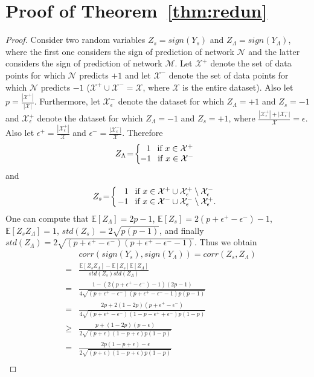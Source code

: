 \documentclass[twoside]{article}
\begin{document}
\section{Proof of Theorem~\ref{thm:redun}}
\begin{proof}
Consider two random variables $Z_s = sign(Y_s)$ and $Z_{\Lambda} = sign(Y_{\Lambda})$, where the first one considers the sign of prediction of network $\mathcal{N}$ and the latter considers the sign of prediction of network $\mathcal{M}$. Let $\mathcal{X}^{+}$ denote the set of data points for which $\mathcal{N}$ predicts $+1$ and let $\mathcal{X}^{-}$ denote the set of data points for which $\mathcal{N}$ predicts $-1$ ($\mathcal{X}^{+} \cup \mathcal{X}^{-} = \mathcal{X}$, where $\mathcal{X}$ is the entire dataset). Also let $p = \frac{|\mathcal{X}^{+}|}{|\mathcal{X}|}$. Furthermore, let $\mathcal{X}_{\epsilon}^{-}$ denote the dataset for which $Z_{\Lambda} = +1$ and $Z_s = -1$ and $\mathcal{X}_{\epsilon}^{+}$ denote the dataset for which $Z_{\Lambda} = -1$ and $Z_s = +1$, where $\frac{|\mathcal{X}_{\epsilon}^{+}| + |\mathcal{X}_{\epsilon}^{-}|}{\mathcal{X}} = \epsilon$. Also let $\epsilon^{+} = \frac{|\mathcal{X}_{\epsilon}^{+}|}{\mathcal{X}}$ and $\epsilon^{-} = \frac{|\mathcal{X}_{\epsilon}^{-}|}{\mathcal{X}}$. Therefore
\[Z_{\Lambda} \!=\! \left \{
  \begin{tabular}{c}
  $1$ \:\:if $x \in \mathcal{X}^{+}$\\
  \!\!\!\!$-1$ \:\:if $x \in \mathcal{X}^{-}$
  \end{tabular}
\right.
\]
and
\[Z_s \!=\! \left \{
  \begin{tabular}{c}
  $1$ \:\:if $x \in \mathcal{X}^{+} \cup \mathcal{X}_{\epsilon}^{+}  \setminus \mathcal{X}_{\epsilon}^{-}$\\
  \!\!\!$-1$ \:\:if $x \in \mathcal{X}^{-} \cup \mathcal{X}_{\epsilon}^{-} \setminus \mathcal{X}_{\epsilon}^{+}$.
  \end{tabular}
\right.
\]
One can compute that $\mathbb{E}[Z_{\Lambda}] = 2p-1$, $\mathbb{E}[Z_s] = 2(p + \epsilon^{+} - \epsilon^{-}) - 1$, $\mathbb{E}[Z_sZ_{\Lambda}] = 1$, $std(Z_s) = 2\sqrt{p(p-1)}$, and finally $std(Z_\Lambda) = 2\sqrt{(p + \epsilon^{+} - \epsilon^{-})(p + \epsilon^{+} - \epsilon^{-} - 1)}$.
Thus we obtain
\begin{eqnarray*}
&&corr(sign(Y_s),sign(Y_{\Lambda})) = corr(Z_s,Z_{\Lambda})\\
&=& \frac{\mathbb{E}[Z_sZ_{\Lambda}] - \mathbb{E}[Z_s]\mathbb{E}[Z_{\Lambda}]}{std(Z_s)std(Z_{\Lambda})}\\
&=& \frac{1 - (2(p + \epsilon^{+} - \epsilon^{-}) - 1)(2p-1)}{4\sqrt{(p + \epsilon^{+} - \epsilon^{-})(p + \epsilon^{+} - \epsilon^{-} - 1)p(p-1)}}\\
&=& \frac{2p + 2(1-2p)(p + \epsilon^{+} - \epsilon^{-})}{4\sqrt{(p + \epsilon^{+} - \epsilon^{-})(1 - p - \epsilon^{+} + \epsilon^{-})p(1 - p)}}\\
&\geq& \frac{p + (1-2p)(p - \epsilon)}{2\sqrt{(p + \epsilon)(1 - p + \epsilon)p(1 - p)}}\\
&=& \frac{2p(1 - p + \epsilon) - \epsilon}{2\sqrt{(p + \epsilon)(1 - p + \epsilon)p(1 - p)}}\\
\end{eqnarray*}
\end{proof}
\end{document}
